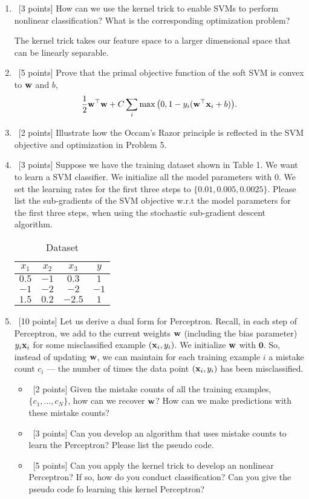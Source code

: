 \documentclass[12pt, fullpage,letterpaper]{article}
\begin{document}
\begin{enumerate}
	
	\item~[3 points] How can we use the kernel trick to enable SVMs to perform nonlinear classification? What is the corresponding optimization problem?
	
	The kernel trick takes our feature space to a larger dimensional space that can be linearly separable.


	\item~[5 points] Prove that the primal objective function of the soft SVM is convex to ${\bf w}$ and $b$, 
	\[
	\frac{1}{2}{\bf w}^\top{\bf w} + C\sum_{i} \max\big(0, 1 - y_i({\bf w}^\top{\bf x}_i+b)\big).
	\]
	
	\item~[2 points] Illustrate how the Occam's Razor principle is reflected in the SVM objective and optimization in Problem 5. 
	
	
	\item~[3 points] Suppose we have the training dataset shown in Table 1. We want to learn a SVM classifier. We initialize all the model parameters with $0$. We set the learning rates for the first three steps to $\{0.01, 0.005, 0.0025\}$.  Please list the sub-gradients of the SVM objective w.r.t the model parameters for the first three steps, when using the stochastic sub-gradient descent algorithm. 
	\begin{table}[h]
		\centering
		\begin{tabular}{ccc|c}
			$x_1$ & $x_2$ & $x_3$ &  $y$\\ 
			\hline\hline
			$0.5$ & $-1$ & $0.3$ & $1$ \\ \hline
			$-1$ & $-2$ & $-2$ & $-1$\\ \hline
			$1.5$ & $0.2$ & $-2.5$ & $1$\\ \hline
		\end{tabular}
	\caption{Dataset}
	\end{table}

	\item~[10 points] Let us derive a dual form for Perceptron. Recall, in each step of Perceptron, we add to the current weights ${\bf w}$ (including the bias parameter) $y_i{\bf x}_i$ for some misclassified example $({\bf x}_i, y_i)$. We initialize ${\bf w}$ with $\mathbf{0}$. So, instead of updating ${\bf w}$, we can maintain for each training example $i$ a mistake count $c_i$ --- the number of times the data point $({\bf x}_i, y_i)$ has been misclassified. 
	
	\begin{itemize}
		\item~[2 points] Given the mistake counts of all the training examples, $\{c_1, \ldots, c_N\}$, how can we recover ${\bf w}$? How can we make predictions with these mistake counts? 
		\item~[3 points] Can you develop an algorithm that uses mistake counts to learn the Perceptron? Please list the pseudo code. 
		\item~[5 points] Can you apply the kernel trick to develop an nonlinear Perceptron? If so, how do you conduct classification? Can you give the pseudo code fo learning this kernel Perceptron? 
	\end{itemize}   
	
\end{enumerate}
\end{document}
